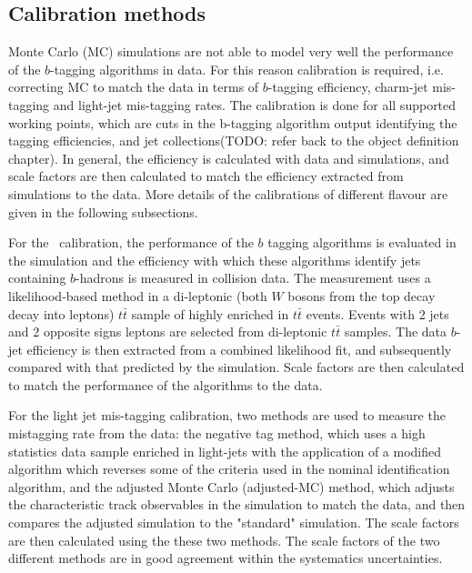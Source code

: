 \documentclass[letterpaper,12pt]{article}
\begin{document}
\subsection{Calibration methods}
Monte Carlo (MC) simulations are not able to model very well the 
performance of the $b$-tagging algorithms in data. For this reason 
calibration is required, i.e. correcting MC to match the data 
in terms of $b$-tagging efficiency, charm-jet mis-tagging and 
light-jet mis-tagging rates\cite{FTAG-2018-01}. The calibration is done 
for all supported working points, which are cuts in the b-tagging 
algorithm output identifying the tagging efficiencies, and jet 
collections(TODO: refer back to the object definition chapter). 
In general, the efficiency is calculated with data and simulations, 
and scale factors are then calculated to match the efficiency extracted 
from simulations to the data. More details of the calibrations of 
different flavour are given in the following subsections.


For the \bjet\ calibration, the performance of the $b$ tagging 
algorithms is evaluated in the simulation and the efficiency 
with which these algorithms identify jets containing $b$-hadrons 
is measured in collision data. The measurement uses a likelihood-based 
method in a di-leptonic (both $W$ bosons from the top decay decay 
into leptons) $t\bar{t}$ sample of highly enriched in $t\bar{t}$ 
events. Events with 2 jets and 2 opposite signs leptons are selected 
from di-leptonic $t\bar{t}$ samples. The data $b$-jet efficiency is 
then extracted from a combined likelihood fit, and subsequently 
compared with that predicted by the simulation. Scale factors are 
then calculated to match the performance of the algorithms to the data\cite{FTAG-2018-01}.

For the light jet mis-tagging calibration, two methods are 
used to measure the mistagging rate from the data: the negative 
tag method, which uses a high statistics data sample enriched 
in light-jets with the application of a modified algorithm which 
reverses some of the criteria used in the nominal identification 
algorithm, and the adjusted Monte Carlo (adjusted-MC) method, which 
adjusts the characteristic track observables in the simulation 
to match the data, and then compares the adjusted simulation to the 
"standard" simulation. The scale factors are then calculated using 
the these two methods. The scale factors of the two different methods 
are in good agreement within the systematics uncertainties\cite{ATLAS-CONF-2018-006}. 
\end{document}
